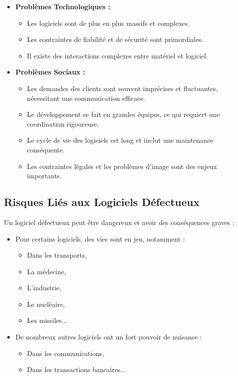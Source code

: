 \documentclass{article}
\begin{document}
\begin{itemize}
    \item \textbf{Problèmes Technologiques :}
    \begin{itemize}
        \item Les logiciels sont de plus en plus massifs et complexes.
        \item Les contraintes de fiabilité et de sécurité sont primordiales.
        \item Il existe des interactions complexes entre matériel et logiciel.
    \end{itemize}
    \item \textbf{Problèmes Sociaux :}
    \begin{itemize}
        \item Les demandes des clients sont souvent imprécises et fluctuantes, nécessitant une communication efficace.
        \item Le développement se fait en grandes équipes, ce qui requiert une coordination rigoureuse.
        \item Le cycle de vie des logiciels est long et inclut une maintenance conséquente.
        \item Les contraintes légales et les problèmes d'image sont des enjeux importants.
    \end{itemize}
\end{itemize}

\subsection{Risques Liés aux Logiciels Défectueux}

Un logiciel défectueux peut être dangereux et avoir des conséquences graves :

\begin{itemize}
    \item Pour certains logiciels, des vies sont en jeu, notamment :
    \begin{itemize}
        \item Dans les transports,
        \item La médecine,
        \item L'industrie,
        \item Le nucléaire,
        \item Les missiles...
    \end{itemize}
    \item De nombreux autres logiciels ont un fort pouvoir de nuisance :
    \begin{itemize}
        \item Dans les communications,
        \item Dans les transactions bancaires...
    \end{itemize}
\end{itemize}
\end{document}
